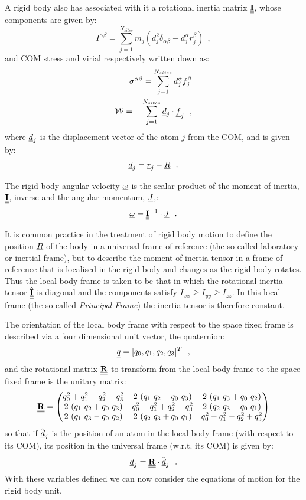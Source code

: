 A rigid body also has associated with it a
rotational inertia matrix $\mbox{$\underline{\underline{\bf I}}$}$, whose components are given by:
\begin{equation}
I^{\alpha\beta}=\sum_{j=1}^{N_{sites}} m_{j} (d_{j}^{2}
\delta_{\alpha \beta}-d_{j}^{\alpha} r_{j}^{\beta})~~,
\end{equation}
and COM stress and virial respectively written down as:
\begin{eqnarray}
\sigma^{\alpha\beta}=\sum_{j=1}^{N_{sites}} d_{j}^{\alpha} f_{j}^{\beta} \nonumber \\
{\cal W} = -\sum_{j=1}^{N_{sites}} \mbox{$\underline{d}$}_{j} \cdot \mbox{$\underline{f}$}_{j}~~,
\end{eqnarray}
where $\mbox{$\underline{d}$}_{j}$ is the displacement vector of the atom $j$ from the
COM, and is given by:
\begin{equation}
\mbox{$\underline{d}$}_{j}=\mbox{$\underline{r}$}_{j}-\mbox{$\underline{R}$}~~.
\end{equation}

The rigid body angular velocity $\mbox{$\underline{\omega}$}$ is the scalar product of
the moment of inertia, $\mbox{$\underline{\underline{\bf I}}$}$, inverse and the angular momentum, $\mbox{$\underline{J}$}$,:
\begin{equation}
\mbox{$\underline{\omega}$} =  \mbox{$\underline{\underline{\bf I}}$}^{-1} \cdot \mbox{$\underline{J}$}~~.
\end{equation}

It is common practice in the treatment of rigid body motion to define
the position $\mbox{$\underline{R}$}$ of the body in a universal frame of reference
(the so called laboratory or inertial frame), but to describe the
moment of inertia tensor in a frame of reference that is localised
in the rigid body and changes as the rigid body rotates.  Thus the
local body frame is taken to be that in which the rotational
inertia tensor $\hat{\mbox{$\underline{\underline{\bf I}}$}}$ is diagonal and the components satisfy
$I_{xx} \ge I_{yy} \ge I_{zz}$.  In this local frame (the so called
{\em Principal Frame}) the inertia tensor is therefore constant.

The orientation of the local body frame with respect to the space fixed
frame is described via a four dimensional unit vector, the quaternion:
\begin{equation}
\mbox{$\underline{q}$} = [q_0,q_1,q_2,q_3]^T~~,
\end{equation}
and the rotational matrix $\mbox{$\underline{\underline{\bf R}}$}$ to transform from the local body
frame to the space fixed frame is the unitary matrix:
\begin{equation}
\mbox{$\underline{\underline{\bf R}}$} =
\begin{pmatrix}
 q_0^2+q_1^2-q_2^2-q_3^2 & 2~(q_1~q_2-q_0~q_3)     & 2~(q_1~q_3+q_0~q_2)     \cr
 2~(q_1~q_2+q_0~q_3)     & q_0^2-q_1^2+q_2^2-q_3^2 & 2~(q_2~q_3-q_0~q_1)     \cr
 2~(q_1~q_3-q_0~q_2)     & 2~(q_2~q_3+q_0~q_1)     & q_0^2-q_1^2-q_2^2+q_3^2 \cr
\end{pmatrix}
\end{equation}
so that if $\hat{\mbox{$\underline{d}$}}_{j}$ is the position of an atom in the local
body frame (with respect to its COM), its position in the universal frame
(w.r.t. its COM) is given by:
\begin{equation}
\mbox{$\underline{d}$}_{j} = \mbox{$\underline{\underline{\bf R}}$} \cdot \hat{\mbox{$\underline{d}$}}_{j}~~.
\end{equation}
With these variables defined we can now consider the equations of
motion for the rigid body unit.

